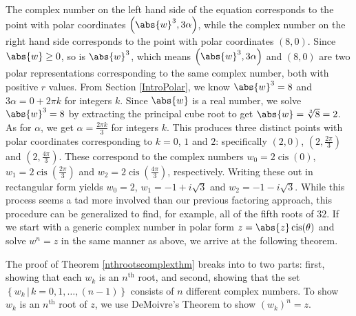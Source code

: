 The complex number on the left hand side of the equation corresponds to the point with polar coordinates $\left(\abs{w}^3, 3\alpha\right)$,   while the complex number on the right hand side corresponds to the point with polar coordinates $(8,0)$.  Since $\abs{w} \geq 0$, so is $\abs{w}^3$, which means  $\left(\abs{w}^3, 3\alpha\right)$ and $(8,0)$ are two polar representations corresponding to the same complex number, both with positive $r$ values.  From Section \ref{IntroPolar}, we know $\abs{w}^3 = 8$ and $3\alpha = 0 + 2\pi k$ for integers $k$.  Since $\abs{w}$ is a real number, we solve $\abs{w}^3 = 8$ by extracting the principal cube root to get  $\abs{w} = \sqrt[3]{8} = 2$.  As for $\alpha$, we get  $\alpha = \frac{2\pi k}{3}$ for integers $k$.  This produces three distinct points with polar coordinates corresponding to $k = 0$, $1$ and $2$: specifically $(2,0)$, $\left(2, \frac{2\pi}{3}\right)$ and $\left(2, \frac{4\pi}{3}\right)$.  These correspond to the complex numbers  $w_{0} = 2 \operatorname{cis}(0)$, $w_{1} = 2 \operatorname{cis}\left(\frac{2\pi}{3}\right)$ and $w_{2} = 2 \operatorname{cis}\left(\frac{4\pi}{3}\right)$, respectively.  Writing these out in rectangular form yields $w_{0} = 2$, $w_{1} = -1 + i\sqrt{3}$ and $w_{2} = -1-i\sqrt{3}$. While this process seems a tad more involved than our previous factoring approach, this procedure can be generalized to find, for example, all of the fifth roots of $32$. If we start with a generic complex number in polar form $z = \abs{z} \operatorname{cis}(\theta)$ and solve $w^{n} = z$ in the same manner as above, we arrive at the following theorem.

\smallskip


\smallskip

The proof of Theorem \ref{nthrootscomplexthm} breaks into to two parts:  first, showing that each $w_{k}$ is an $n^{\text{th}}$ root, and second, showing that the set  $\left\{ w_{k} \, | \, k = 0, 1, \ldots, (n-1)\right\}$ consists of $n$ different  complex numbers.  To show $w_{k}$ is an  $n^{\text{th}}$ root of $z$, we use DeMoivre's Theorem to show $\left(w_{k}\right)^n = z$.

